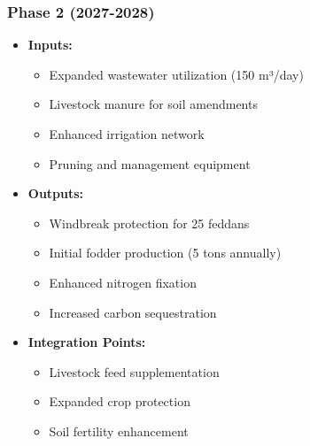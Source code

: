 \subsubsection{Phase 2 (2027-2028)}
\begin{itemize}
    \item \textbf{Inputs:}
    \begin{itemize}
        \item Expanded wastewater utilization (150 m³/day)
        \item Livestock manure for soil amendments
        \item Enhanced irrigation network
        \item Pruning and management equipment
    \end{itemize}
    \item \textbf{Outputs:}
    \begin{itemize}
        \item Windbreak protection for 25 feddans
        \item Initial fodder production (5 tons annually)
        \item Enhanced nitrogen fixation
        \item Increased carbon sequestration
    \end{itemize}
    \item \textbf{Integration Points:}
    \begin{itemize}
        \item Livestock feed supplementation
        \item Expanded crop protection
        \item Soil fertility enhancement
    \end{itemize}
\end{itemize}

